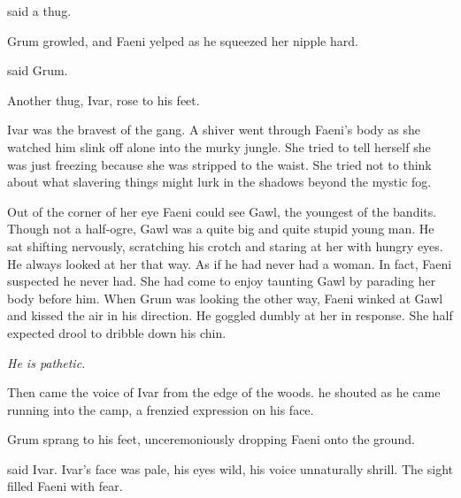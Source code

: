  said a thug.

Grum growled, and Faeni yelped as he squeezed her nipple hard.


 said Grum.

Another thug, Ivar, rose to his feet.

Ivar was the bravest of the gang. 
A shiver went through Faeni's body as she watched him slink off alone into the murky jungle. 
She tried to tell herself she was just freezing because she was stripped to the waist. 
She tried not to think about what slavering things might lurk in the shadows beyond the mystic fog. 


Out of the corner of her eye Faeni could see Gawl, the youngest of the bandits. 
Though not a half-ogre, Gawl was a quite big and quite stupid young man. 
He sat shifting nervously, scratching his crotch and staring at her with hungry eyes. 
He always looked at her that way. 
As if he had never had a woman.
In fact, Faeni suspected he never had. 
She had come to enjoy taunting Gawl by parading her body before him. 
When Grum was looking the other way, Faeni winked at Gawl and kissed the air in his direction.
He goggled dumbly at her in response. 
She half expected drool to dribble down his chin. 

\emph{He is pathetic.}

Then came the voice of Ivar from the edge of the woods. 
 he shouted as he came running into the camp, a frenzied expression on his face. 

Grum sprang to his feet, unceremoniously dropping Faeni onto the ground. 

 said Ivar.
Ivar's face was pale, his eyes wild, his voice unnaturally shrill. 
The sight filled Faeni with fear. 

